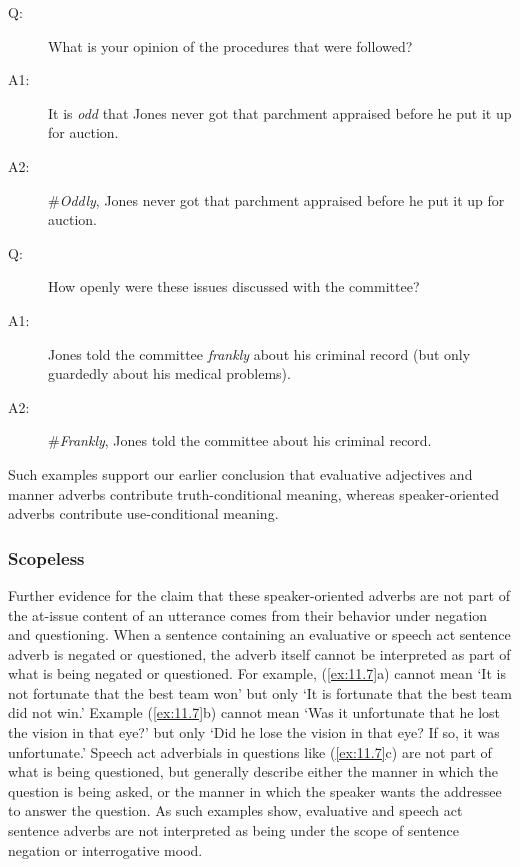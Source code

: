 \ea \label{ex:11.30}
\begin{description}
\item[Q:] What is your opinion of the procedures that were followed?\\
\item[A1:] It is \textit{odd} that Jones never got that parchment appraised before he put it up for auction.\\
\item[A2:] \#\textit{Oddly}, Jones never got that parchment appraised before he put it up for auction.\\	
\end{description}
\z


\ea \label{ex:11.31}
\begin{description}
\item[Q:] How openly were these issues discussed with the committee?\\
\item[A1:] Jones told the committee \textit{frankly} about his criminal record (but only guardedly about his medical problems).\\
\item[A2:] \#\textit{Frankly}, Jones told the committee about his criminal record.\\	
\end{description}
\z 


Such examples support our earlier conclusion that evaluative adjectives and manner adverbs contribute truth-conditional meaning, whereas speaker-ori\-ent\-ed adverbs contribute use-conditional meaning.



\subsubsection{Scopeless}


Further evidence for the claim that these speaker-oriented adverbs are not part of the at-issue content of an utterance comes from their behavior under negation and questioning. When a sentence containing an evaluative or speech act sentence adverb is negated or questioned, the adverb itself cannot be interpreted as part of what is being negated or questioned. For example, (\ref{ex:11.7}a) cannot mean ‘It is not fortunate that the best team won’ but only ‘It is fortunate that the best team did not win.’ Example (\ref{ex:11.7}b) cannot mean ‘Was it unfortunate that he lost the vision in that eye?’ but only ‘Did he lose the vision in that eye? If so, it was unfortunate.’ Speech act adverbials in questions like (\ref{ex:11.7}c) are not part of what is being questioned, but generally describe either the manner in which the question is being asked, or the manner in which the speaker wants the addressee to answer the question. As such examples show, evaluative and speech act sentence adverbs are not interpreted as being under the scope of sentence negation or interrogative mood.


